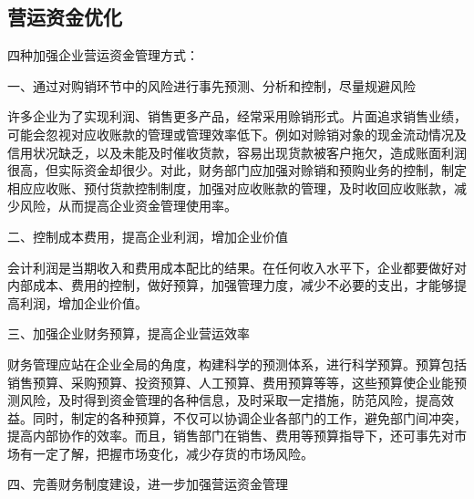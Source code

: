 \subsection { 营运资金优化}

    四种加强企业营运资金管理方式：

    一、通过对购销环节中的风险进行事先预测、分析和控制，尽量规避风险

    许多企业为了实现利润、销售更多产品，经常采用赊销形式。片面追求销售业绩，可能会忽视对应收账款的管理或管理效率低下。例如对赊销对象的现金流动情况及信用状况缺乏，以及未能及时催收货款，容易出现货款被客户拖欠，造成账面利润很高，但实际资金却很少。对此，财务部门应加强对赊销和预购业务的控制，制定相应应收账、预付货款控制制度，加强对应收账款的管理，及时收回应收账款，减少风险，从而提高企业资金管理使用率。

    二、控制成本费用，提高企业利润，增加企业价值

    会计利润是当期收入和费用成本配比的结果。在任何收入水平下，企业都要做好对内部成本、费用的控制，做好预算，加强管理力度，减少不必要的支出，才能够提高利润，增加企业价值。

    三、加强企业财务预算，提高企业营运效率

    财务管理应站在企业全局的角度，构建科学的预测体系，进行科学预算。预算包括销售预算、采购预算、投资预算、人工预算、费用预算等等，这些预算使企业能预测风险，及时得到资金管理的各种信息，及时采取一定措施，防范风险，提高效益。同时，制定的各种预算，不仅可以协调企业各部门的工作，避免部门间冲突，提高内部协作的效率。而且，销售部门在销售、费用等预算指导下，还可事先对市场有一定了解，把握市场变化，减少存货的市场风险。

    四、完善财务制度建设，进一步加强营运资金管理

